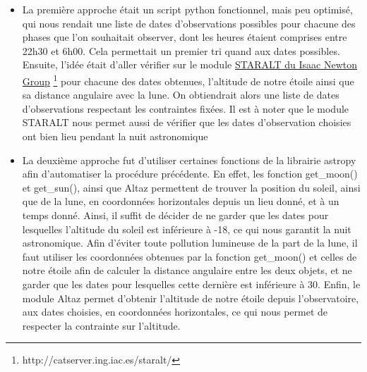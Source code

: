 \documentclass[10pt,french, openany]{book}
\begin{document}
    \begin{itemize}
        \item La première approche était un script python fonctionnel, mais peu optimisé, qui nous rendait une liste de dates d'observations possibles pour chacune des phases que l'on souhaitait observer, dont les heures étaient comprises entre 22h30 et 6h00. Cela permettait un premier tri quand aux dates possibles. Ensuite, l'idée était d'aller vérifier sur le module \href{http://catserver.ing.iac.es/staralt/}{STARALT du Isaac Newton Group} \footnote{http://catserver.ing.iac.es/staralt/} pour chacune des dates obtenues, l'altitude de notre étoile ainsi que sa distance angulaire avec la lune. On obtiendrait alors une liste de dates d'observations respectant les contraintes fixées. Il est à noter que le module STARALT nous permet aussi de vérifier que les dates d'observation choisies ont bien lieu pendant la nuit astronomique
        \item La deuxième approche fut d'utiliser certaines fonctions de la librairie astropy afin d'automatiser la procédure précédente. En effet, les fonction get\_moon() et get\_sun(), ainsi que Altaz permettent de trouver la position du soleil, ainsi que de la lune, en coordonnées horizontales depuis un lieu donné, et à un temps donné. Ainsi, il suffit de décider de ne garder que les dates pour lesquelles l'altitude du soleil est inférieure à -18\degree, ce qui nous garantit la nuit astronomique. Afin d'éviter toute pollution lumineuse de la part de la lune, il faut utiliser les coordonnées obtenues par la fonction get\_moon() et celles de notre étoile afin de calculer la distance angulaire entre les deux objets, et ne garder que les dates pour lesquelles cette dernière est inférieure à 30\degree. Enfin, le module Altaz permet d'obtenir l'altitude de notre étoile depuis l'observatoire, aux dates choisies, en coordonnées horizontales, ce qui nous permet de respecter la contrainte sur l'altitude.
    \end{itemize}
    
\end{document}
